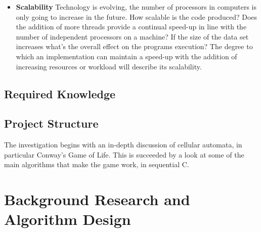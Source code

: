 \documentclass[11pt]{article} %
\begin{document}
\begin{itemize}
\item {\bf Scalability} Technology is evolving, the number of processors in computers is only going to increase in the future. How scalable is the code produced? Does the addition of more threads provide a continual speed-up in line with the number of independent processors on a machine? If the size of the data set increases what's the overall effect on the programs execution? The degree to which an implementation can maintain a speed-up with the addition of increasing resources or workload will describe its scalability.
\end{itemize}
\subsection{Required Knowledge}
\subsection{Project Structure}
The investigation begins with an in-depth discussion of cellular automata, in particular Conway's Game of Life. This is succeeded by a look at some of the main algorithms that make the game work, in sequential C. 
\section{Background Research and Algorithm Design}
\end{document}
